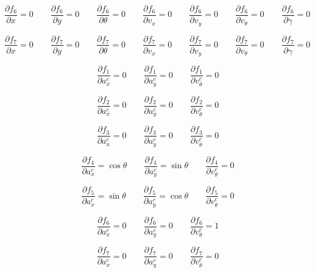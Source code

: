 \documentclass[oneside, 12pt, a4paper]{book}
\begin{document}
\begin{equation}
    \frac{\partial f_6}{\partial x} = 0 \qquad
    \frac{\partial f_6}{\partial y} = 0 \qquad
    \frac{\partial f_6}{\partial \theta} = 0 \qquad
    \frac{\partial f_6}{\partial v_x} = 0 \qquad
    \frac{\partial f_6}{\partial v_y} = 0 \qquad
    \frac{\partial f_6}{\partial v_\theta} = 0 \qquad
    \frac{\partial f_6}{\partial \gamma} = 0 \qquad
\end{equation}

\begin{equation}
    \frac{\partial f_7}{\partial x} = 0 \qquad
    \frac{\partial f_7}{\partial y} = 0 \qquad
    \frac{\partial f_7}{\partial \theta} = 0 \qquad
    \frac{\partial f_7}{\partial v_x} = 0 \qquad
    \frac{\partial f_7}{\partial v_y} = 0 \qquad
    \frac{\partial f_7}{\partial v_\theta} = 0 \qquad
    \frac{\partial f_7}{\partial \gamma} = 0 \qquad
\end{equation}


\begin{equation}
    \frac{\partial f_1}{\partial a^c_x} = 0 \qquad
    \frac{\partial f_1}{\partial a^c_y} = 0 \qquad
    \frac{\partial f_1}{\partial v^c_\theta} = 0
\end{equation}

\begin{equation}
    \frac{\partial f_2}{\partial a^c_x} = 0 \qquad
    \frac{\partial f_2}{\partial a^c_y} = 0 \qquad
    \frac{\partial f_2}{\partial v^c_\theta} = 0
\end{equation}

\begin{equation}
    \frac{\partial f_3}{\partial a^c_x} = 0 \qquad
    \frac{\partial f_3}{\partial a^c_y} = 0 \qquad
    \frac{\partial f_3}{\partial v^c_\theta} = 0
\end{equation}

\begin{equation}
    \frac{\partial f_4}{\partial a^c_x} = \cos \theta \qquad
    \frac{\partial f_4}{\partial a^c_y} = \sin \theta \qquad
    \frac{\partial f_4}{\partial v^c_\theta} = 0
\end{equation}

\begin{equation}
    \frac{\partial f_5}{\partial a^c_x} = \sin \theta \qquad
    \frac{\partial f_5}{\partial a^c_y} = \cos \theta \qquad
    \frac{\partial f_5}{\partial v^c_\theta} = 0
\end{equation}

\begin{equation}
    \frac{\partial f_6}{\partial a^c_x} = 0 \qquad
    \frac{\partial f_6}{\partial a^c_y} = 0 \qquad
    \frac{\partial f_6}{\partial v^c_\theta} = 1
\end{equation}

\begin{equation}
    \frac{\partial f_7}{\partial a^c_x} = 0 \qquad
    \frac{\partial f_7}{\partial a^c_y} = 0 \qquad
    \frac{\partial f_7}{\partial v^c_\theta} = 0
\end{equation}
\end{document}
